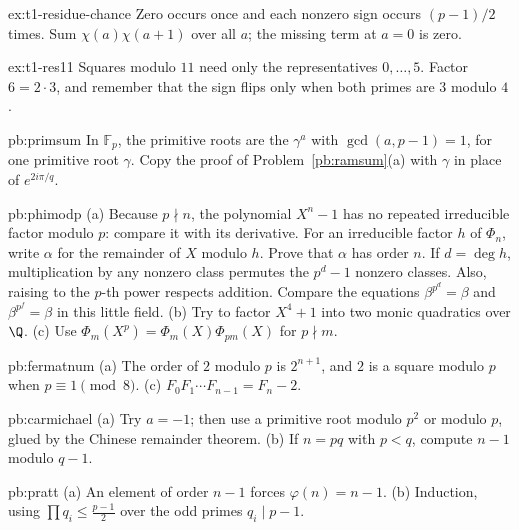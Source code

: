 \begin{hint}{ex:t1-residue-chance}
Zero occurs once and each nonzero sign occurs $(p-1)/2$ times.
Sum $\chi(a)\chi(a+1)$ over all $a$; the missing term at $a=0$ is zero.
\end{hint}

\begin{hint}{ex:t1-res11}
Squares modulo $11$ need only the representatives $0,\ldots,5$. Factor $6=2\cdot 3$, and remember that the sign flips only when both primes are $3$ modulo $4$.
\end{hint}

\begin{hint}{pb:primsum}
In $\mathbb F_p$, the primitive roots are the $\gamma^a$ with $\gcd(a,p-1)=1$, for one primitive root $\gamma$. Copy the
proof of Problem~\ref{pb:ramsum}(a) with $\gamma$ in place of $e^{2i\pi/q}$.
\end{hint}

\begin{hint}{pb:phimodp}
(a) Because $p\nmid n$, the polynomial $X^n-1$
has no repeated irreducible factor modulo $p$:
compare it with its derivative.
For an irreducible factor $h$ of $\Phi_n$, write
$\alpha$ for the remainder of $X$ modulo $h$.
Prove that $\alpha$ has order $n$.
If $d=\deg h$, multiplication by any nonzero
class permutes the $p^d-1$ nonzero classes.
Also, raising to the $p$-th power respects addition.
Compare the equations $\beta^{p^d}=\beta$ and
$\beta^{p^f}=\beta$ in this little field.
(b) Try to factor $X^4+1$ into two monic quadratics over $\Q$.
(c) Use $\Phi_m(X^p)=\Phi_m(X)\Phi_{pm}(X)$ for $p\nmid m$.
\end{hint}

\begin{hint}{pb:fermatnum}
(a) The order of $2$ modulo $p$ is $2^{n+1}$, and $2$ is a square modulo $p$ when $p\equiv1\pmod8$. (c) $F_0F_1\cdots F_{n-1}=F_n-2$.
\end{hint}

\begin{hint}{pb:carmichael}
(a) Try $a=-1$; then use a primitive root modulo $p^2$ or modulo $p$, glued by the Chinese remainder theorem. (b) If $n=pq$
with $p<q$, compute $n-1$ modulo $q-1$.
\end{hint}

\begin{hint}{pb:pratt}
(a) An element of order $n-1$ forces $\varphi(n)=n-1$. (b) Induction, using $\prod q_i\le\frac{p-1}2$ over the odd primes $q_i\mid p-1$.
\end{hint}

